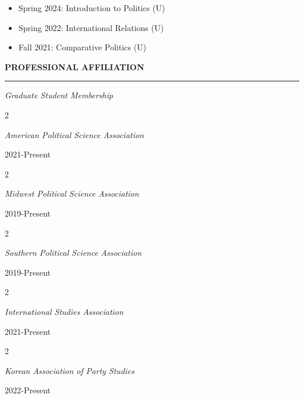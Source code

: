 \documentclass[
  16,
]{article}
\providecommand{\tightlist}{%
  \setlength{\itemsep}{0pt}\setlength{\parskip}{0pt}}
\begin{document}
\begin{itemize}
\tightlist
\item
  Spring 2024: Introduction to Politics (U)
\item
  Spring 2022: International Relations (U)
\item
  Fall 2021: Comparative Politics (U)
\end{itemize}

\vspace{7pt}
\begin{large}
  {\bf PROFESSIONAL AFFILIATION}
  \vspace{3pt}
  \hrule
  \textit{Graduate Student Membership}
  \end{large}
  \begin{multicols}{2}
    \begin{flushleft}\textit{American Political Science Association}\end{flushleft}
    \begin{flushright}2021-Present\end{flushright}
  \end{multicols}
    \begin{multicols}{2}
    \begin{flushleft}\textit{Midwest Political Science Association}\end{flushleft}
    \begin{flushright}2019-Present\end{flushright}
  \end{multicols}
    \begin{multicols}{2}
    \begin{flushleft}\textit{Southern Political Science Association}\end{flushleft}
    \begin{flushright}2019-Present\end{flushright}
  \end{multicols}
    \begin{multicols}{2}
    \begin{flushleft}\textit{International Studies Association}\end{flushleft}
    \begin{flushright}2021-Present\end{flushright}
  \end{multicols}
    \begin{multicols}{2}
    \begin{flushleft}\textit{Korean Association of Party Studies}\end{flushleft}
    \begin{flushright}2022-Present\end{flushright}
  \end{multicols}
\end{document}
